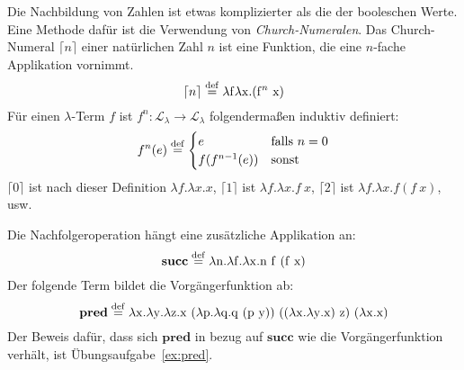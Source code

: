 Die Nachbildung von Zahlen ist etwas komplizierter als die der
booleschen Werte.  Eine Methode dafür ist
die Verwendung von \textit{Church-Numeralen}.  Das
Church-Numeral $\lceil n\rceil$ einer natürlichen Zahl
$n$ ist eine Funktion, die eine $n$-fache Applikation vornimmt.
%
\begin{displaymath}
  \lceil n\rceil \stackrel{\rm def}{=}{} \lambda \mathrm f\lambda \mathrm x.(\mathrm{f}^n~\mathrm x)
\end{displaymath}
Für einen $\lambda$-Term $f$ ist $f^n : \mathcal{L}_{\lambda}\rightarrow\mathcal{L}_{\lambda}$ folgendermaßen induktiv definiert:
%
\begin{displaymath}
  f^n(e) \stackrel{\rm def}{=}
  \begin{cases}
    e & \text{falls } n = 0\\
    f(f^{n-1}(e)) & \text{sonst}
  \end{cases}
\end{displaymath}
%
$\lceil 0\rceil$ ist nach dieser Definition
$\lambda f.\lambda x.x$, $\lceil 1\rceil$ ist $\lambda f.\lambda x.f~x$,
$\lceil 2\rceil$ ist $\lambda f.\lambda x.f(f~x)$, usw.

Die Nachfolgeroperation hängt eine zusätzliche Applikation an:
%
\begin{displaymath}
  \mathbf{succ} \stackrel{\rm def}{=}{} \lambda \mathrm n.\lambda \mathrm f.\lambda \mathrm x.\mathrm n~\mathrm f~(\mathrm f~\mathrm x)
\end{displaymath}
%
Der folgende Term bildet die Vorgängerfunktion ab:
%
\begin{displaymath}
  \mathbf{pred} \stackrel{\rm def}{=}{} \lambda \mathrm x.\lambda \mathrm y.\lambda \mathrm z.\mathrm x~(\lambda \mathrm p.\lambda
  \mathrm q.\mathrm q~(\mathrm p~\mathrm y))~((\lambda \mathrm x.\lambda \mathrm y.\mathrm x)~\mathrm z)~(\lambda \mathrm x.\mathrm x)
\end{displaymath}
%
Der Beweis dafür, dass sich $\mathbf{pred}$ in bezug auf $\mathbf{succ}$ wie die
Vorgängerfunktion verhält, ist Übungsaufgabe~\ref{ex:pred}.

